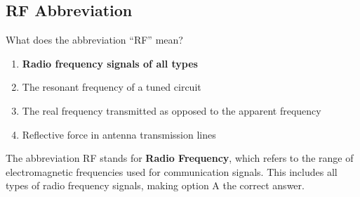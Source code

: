 \subsection{RF Abbreviation}
\label{T5C06}

\begin{tcolorbox}[colback=gray!10!white,colframe=black!75!black,title=T5C06]
What does the abbreviation “RF” mean?
\begin{enumerate}[noitemsep]
    \item \textbf{Radio frequency signals of all types}
    \item The resonant frequency of a tuned circuit
    \item The real frequency transmitted as opposed to the apparent frequency
    \item Reflective force in antenna transmission lines
\end{enumerate}
\end{tcolorbox}

The abbreviation RF stands for \textbf{Radio Frequency}, which refers to the range of electromagnetic frequencies used for communication signals. This includes all types of radio frequency signals, making option A the correct answer.